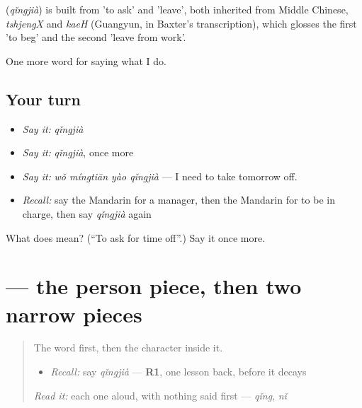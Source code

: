 \begin{cousinweb}
\textbf{} (\emph{qǐngjià}) is built from  'to ask' and  'leave', both inherited from Middle Chinese, \emph{tshjengX} and \emph{kaeH} (Guangyun, in Baxter's transcription), which glosses the first 'to beg' and the second 'leave from work'.
\end{cousinweb}

\begin{grammarlens}[title={What you've built}]
One more word for saying what I do.
\end{grammarlens}

\subsection*{Your turn}
\begin{itemize}
\raggedright
  \item \emph{Say it:} \emph{qǐngjià}
  \item \emph{Say it:} \emph{qǐngjià}, once more
  \item \emph{Say it:} \emph{wǒ míngtiān yào qǐngjià} — I need to take tomorrow off.
  \item \emph{Recall:} say the Mandarin for a manager, then the Mandarin for to be in charge, then say \emph{qǐngjià} again
\end{itemize}

\begin{tcolorbox}[breakable,colback=teal!4,colframe=teal!35!black,title={Before you move on}]
What does  mean? (\textquotedblleft{}To ask for time off\textquotedblright{}.) Say it once more.
\end{tcolorbox}
\section[\texorpdfstring{\zh{假} (jià)}{假 (jià)}]{ — the person piece, then two narrow pieces}

\label{lesson:ZH-W263-jia-leave}



\begin{quote}
The word first, then the character inside it.

\begin{itemize}
\raggedright
  \item \emph{Recall:} say \emph{qǐngjià} — \textbf{R1}, one lesson back, before it decays
\end{itemize}

\begin{quote}
 
\end{quote}

\emph{Read it:} each one aloud, with nothing said first — \emph{qǐng}, \emph{nǐ}
\end{quote}


